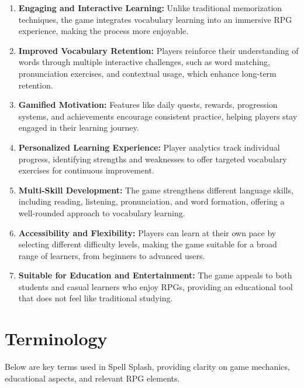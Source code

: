 \begin{enumerate}
    \item \textbf{Engaging and Interactive Learning:} Unlike traditional memorization techniques, the game integrates vocabulary learning into an immersive RPG experience, making the process more enjoyable.

    \item \textbf{Improved Vocabulary Retention:} Players reinforce their understanding of words through multiple interactive challenges, such as word matching, pronunciation exercises, and contextual usage, which enhance long-term retention.

    \item \textbf{Gamified Motivation:} Features like daily quests, rewards, progression systems, and achievements encourage consistent practice, helping players stay engaged in their learning journey.

    \item \textbf{Personalized Learning Experience:} Player analytics track individual progress, identifying strengths and weaknesses to offer targeted vocabulary exercises for continuous improvement.

    \item \textbf{Multi-Skill Development:} The game strengthens different language skills, including reading, listening, pronunciation, and word formation, offering a well-rounded approach to vocabulary learning.

    \item \textbf{Accessibility and Flexibility:} Players can learn at their own pace by selecting different difficulty levels, making the game suitable for a broad range of learners, from beginners to advanced users.

    \item \textbf{Suitable for Education and Entertainment:} The game appeals to both students and casual learners who enjoy RPGs, providing an educational tool that does not feel like traditional studying.
\end{enumerate}

\section{Terminology}
\label{section:terminology}

Below are key terms used in Spell Splash, providing clarity on game mechanics, educational aspects, and relevant RPG elements.

\vspace{1em}

